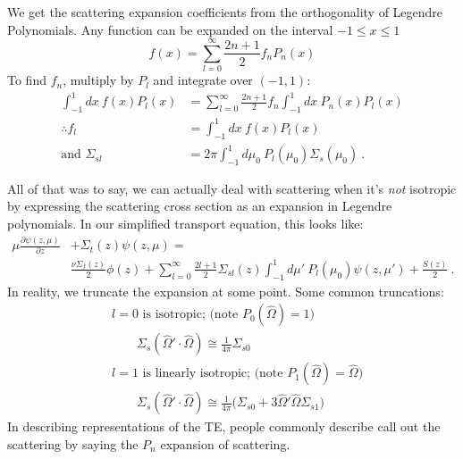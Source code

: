 \documentclass[12pt]{article}
\newcommand{\vOmega}{\ensuremath{\hat{\Omega}}}
\begin{document}
We get the scattering expansion coefficients from the orthogonality of Legendre Polynomials. Any function can be expanded on the interval $-1 \leq x \leq 1$
\[
f(x) = \sum_{l=0}^{\infty} \frac{2n+1}{2} f_n P_n(x)
\]
To find $f_n$, multiply by $P_l$ and integrate over $(-1,1)$:
\begin{align*}
\int_{-1}^1 dx\: f(x) P_l(x) &= \sum_{l=0}^{\infty} \frac{2n+1}{2} f_n\int_{-1}^1 dx\:  P_n(x) P_l(x)\\
\therefore f_l &= \int_{-1}^1 dx\: f(x) P_l(x)\\
\text{and }\Sigma_{sl} &= 2\pi \int_{-1}^1 d\mu_0 \: P_l(\mu_0)\Sigma_s(\mu_0)\:.
\end{align*}

All of that was to say, we can actually deal with scattering when it's \textit{not} isotropic by expressing the scattering cross section as an expansion in Legendre polynomials. In our simplified transport equation, this looks like:
\begin{align*}
\mu \frac{\partial \psi(z, \mu)}{\partial z} &+ \Sigma_t(z)\psi(z, \mu) = \\
&\frac{\nu\Sigma_f(z) }{2}\phi(z) +  \sum_{l=0}^{\infty} \frac{2l+1}{2} \Sigma_{sl}(z) \int_{-1}^1 d\mu'\: P_l(\mu_0) \psi(z, \mu')  + \frac{S(z)}{2} \:.
\end{align*}
%
In reality, we truncate the expansion at some point. Some common truncations:
\begin{align*}
&l=0 \text{ is isotropic; (note } P_0 (\vOmega) = 1 \text{)}\\
&\qquad \Sigma_s(\vOmega' \cdot \vOmega) \cong \frac{1}{4\pi}\Sigma_{s0} \\
%
&l=1 \text{ is linearly isotropic; (note } P_1 (\vOmega) = \vOmega \text{)}\\
&\qquad \Sigma_s(\vOmega' \cdot \vOmega) \cong \frac{1}{4\pi}\bigl( \Sigma_{s0} + 3\vOmega' \vOmega \Sigma_{s1} \bigr) 
\end{align*}
%
In describing representations of the TE, people commonly describe call out the scattering by saying the $P_n$ expansion of scattering. 
\end{document}
